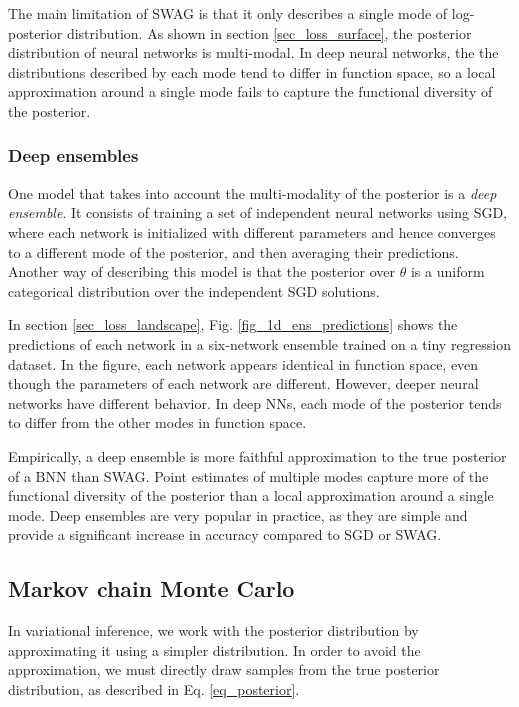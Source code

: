 \documentclass[12pt]{article}
\begin{document}
The main limitation of SWAG is that it only describes a single mode of log-posterior distribution. As shown in section \ref{sec_loss_surface}, the posterior distribution of neural networks is multi-modal. In deep neural networks, the the distributions described by each mode tend to differ in function space, so a local approximation around a single mode fails to capture the functional diversity of the posterior. \cite{deep_ens}

\subsubsection{Deep ensembles}

One model that takes into account the multi-modality of the posterior is a \textit{deep ensemble}. It consists of training a set of independent neural networks using SGD, where each network is initialized with different parameters and hence converges to a different mode of the posterior, and then averaging their predictions. Another way of describing this model is that the posterior over $\theta$ is a uniform categorical distribution over the independent SGD solutions.

In section \ref{sec_loss_landscape}, Fig. \ref{fig_1d_ens_predictions} shows the predictions of each network in a six-network ensemble trained on a tiny regression dataset. In the figure, each network appears identical in function space, even though the parameters of each network are different. However, deeper neural networks have different behavior. In deep NNs, each mode of the posterior tends to differ from the other modes in function space. \cite{deep_ens}

Empirically, a deep ensemble is more faithful approximation to the true posterior of a BNN than SWAG. \cite{bnn_posteriors} Point estimates of multiple modes capture more of the functional diversity of the posterior than a local approximation around a single mode. Deep ensembles are very popular in practice, as they are simple and provide a significant increase in accuracy compared to SGD or SWAG. \cite{multiswag} 

\subsection{Markov chain Monte Carlo}

In variational inference, we work with the posterior distribution by approximating it using a simpler distribution. In order to avoid the approximation, we must directly draw samples from the true posterior distribution, as described in Eq. \ref{eq_posterior}.
\end{document}
